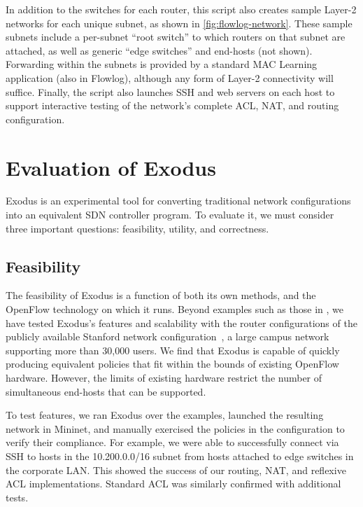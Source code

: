 In addition to the switches for each router, this script also creates sample
Layer-2 networks for each unique subnet, as shown in
\autoref{fig:flowlog-network}.  These sample subnets include a per-subnet
``root switch'' to which routers on that subnet are attached, as well as
generic ``edge switches'' and end-hosts (not shown).
Forwarding within the subnets is provided by a standard MAC Learning
application (also in Flowlog), although any form of Layer-2 connectivity will suffice.
Finally, the script also
launches SSH and web servers on each host to support interactive testing of the
network's complete ACL, NAT, and routing configuration.

\chapter{Evaluation of Exodus}
\label{sec:evaluation}

Exodus is an experimental tool for converting traditional network configurations
into an equivalent SDN controller program. To evaluate it, we must consider three
important questions: feasibility, utility, and correctness.

\section{Feasibility}
\label{sec:feasibility}

The feasibility of Exodus is a function of both its own methods, and the OpenFlow
technology on which it runs. Beyond examples such as those in
, we have tested Exodus's 
features and scalability with the router configurations of
the publicly available Stanford network configuration~\cite{zeng12test},
a large campus network supporting more than 30,000 users. We find that Exodus
is capable of quickly producing equivalent policies that fit within the bounds of
existing OpenFlow hardware. However, the limits of existing
hardware restrict the number of simultaneous end-hosts that can be supported.

To test features, we ran Exodus over the  examples,
launched the resulting network in Mininet, and manually exercised the
policies in the configuration to verify their compliance. For example, 
we were able to successfully connect
via SSH to hosts in the 10.200.0.0/16 subnet from hosts attached to edge switches in
the corporate LAN. This showed the success of our routing, NAT, and reflexive ACL
implementations. Standard ACL was similarly confirmed with additional tests.

